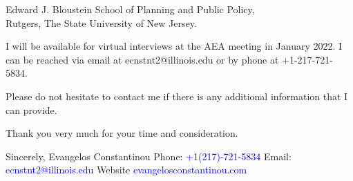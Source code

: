 \documentclass[12pt]{letter}
\begin{document}
\begin{letter}{Edward J. Bloustein School of Planning and Public Policy,\\
Rutgers, The State University of New Jersey.}





I will be available for virtual interviews at the AEA meeting in January 2022.
I can be reached via email at ecnstnt2@illinois.edu or by phone at +1-217-721-5834.

Please do not hesitate to contact me if there is any additional information that I can provide.

Thank you very much for your time and consideration.


\noindent Sincerely,
\newline\noindent Evangelos Constantinou
\vspace{4mm}
\newline\noindent Phone: \textcolor{blue}{+1(217)-721-5834}
\newline\noindent Email: \textcolor{blue}{ecnstnt2@illinois.edu}
\newline\noindent Website \textcolor{blue}{evangelosconstantinou.com}
\end{letter}
\end{document}

